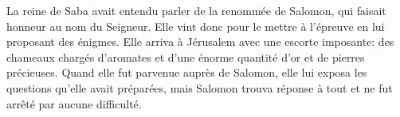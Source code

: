 La reine de Saba avait entendu parler de la renommée de Salomon,
	qui faisait honneur au nom du Seigneur.
	Elle vint donc pour le mettre à l’épreuve en lui proposant des énigmes.
Elle arriva à Jérusalem avec une escorte imposante:
	des chameaux chargés d’aromates
		et d’une énorme quantité d’or et de pierres précieuses.
Quand elle fut parvenue auprès de Salomon,
	elle lui exposa les questions qu’elle avait préparées,
	mais Salomon trouva réponse à tout et ne fut arrêté par aucune difficulté.
